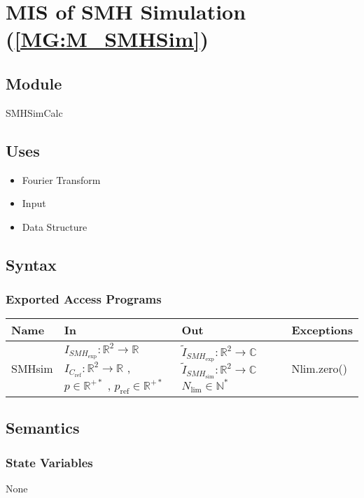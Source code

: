 \documentclass[12pt, titlepage]{article}
\begin{document}
\section{MIS of SMH Simulation (\texorpdfstring{\cref{MG:M_SMHSim}}))} \label{MIS_SHMSim}

\subsection{Module}
SMHSimCalc
\subsection{Uses}
\begin{itemize}
\item Fourier Transform
\item Input
\item Data Structure
\end{itemize}

\subsection{Syntax}

\subsubsection{Exported Access Programs}

\begin{center}
\begin{tabular}{p{2cm} p{4cm} p{4cm} p{2cm}}
\hline
\textbf{Name} & \textbf{In} & \textbf{Out} & \textbf{Exceptions} \\
\hline
SMHsim & $I_{\mathit{SMH}_{\text{exp}}}:\mathbb{R}^2\rightarrow\mathbb{R} $ $ I_{C_{\text{ref}}}:\mathbb{R}^2\rightarrow\mathbb{R}$ , $p \in \mathbb{R}^{+*}$ , $p_{\text{ref}} \in \mathbb{R}^{+*}$ & $\widetilde{I}_{\mathit{SMH}_{\text{exp}}}:\mathbb{R}^2\rightarrow\mathbb{C}$ $\widetilde{I}_{\mathit{SMH}_{\text{sim}}}:\mathbb{R}^2\rightarrow\mathbb{C}$ $N_{\text{lim}} \in \mathbb{N}^{*}$ & Nlim.zero() \\
\hline
\end{tabular}
\end{center}

\subsection{Semantics}

\subsubsection{State Variables}
None
\end{document}
